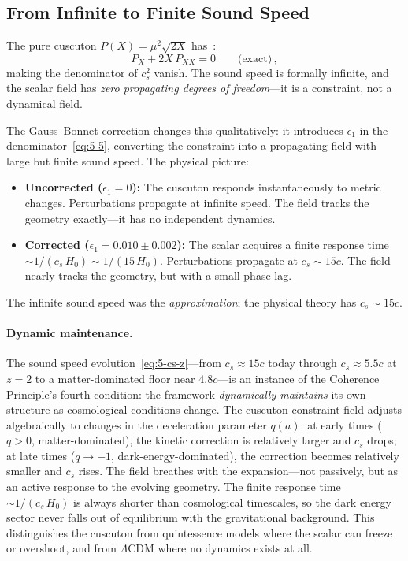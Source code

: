 \subsection{From Infinite to Finite Sound Speed}
\label{sec:5-infinite-to-finite}

The pure cuscuton $P(X) = \mu^2\sqrt{2X}$ has~\cite{ch5:Afshordi2007}:
\begin{equation}
  P_X + 2X\,P_{XX} = 0 \qquad\text{(exact)}\,,
  \label{eq:5-15}
\end{equation}
making the denominator of $c_s^2$ vanish. The sound speed is formally infinite, and the scalar field has \emph{zero propagating degrees of freedom}---it is a constraint, not a dynamical field.

The Gauss--Bonnet correction changes this qualitatively: it introduces $\epsilon_1$ in the denominator~\eqref{eq:5-5}, converting the constraint into a propagating field with large but finite sound speed. The physical picture:

\begin{itemize}
\item \textbf{Uncorrected ($\epsilon_1 = 0$):} The cuscuton responds instantaneously to metric changes. Perturbations propagate at infinite speed. The field tracks the geometry exactly---it has no independent dynamics.

\item \textbf{Corrected ($\epsilon_1 = 0.010 \pm 0.002$):} The scalar acquires a finite response time $\sim 1/(c_s\,H_0) \sim 1/(15\,H_0)$. Perturbations propagate at $c_s \sim 15c$. The field nearly tracks the geometry, but with a small phase lag.
\end{itemize}

The infinite sound speed was the \emph{approximation}; the physical theory has $c_s \sim 15c$.

\paragraph{Dynamic maintenance.}
The sound speed evolution~\eqref{eq:5-cs-z}---from $c_s \approx 15c$ today through $c_s \approx 5.5c$ at $z = 2$ to a matter-dominated floor near $4.8c$---is an instance of the Coherence Principle's fourth condition: the framework \emph{dynamically maintains} its own structure as cosmological conditions change. The cuscuton constraint field adjusts algebraically to changes in the deceleration parameter $q(a)$: at early times ($q > 0$, matter-dominated), the kinetic correction is relatively larger and $c_s$ drops; at late times ($q \to -1$, dark-energy-dominated), the correction becomes relatively smaller and $c_s$ rises. The field breathes with the expansion---not passively, but as an active response to the evolving geometry. The finite response time $\sim 1/(c_s\,H_0)$ is always shorter than cosmological timescales, so the dark energy sector never falls out of equilibrium with the gravitational background. This distinguishes the cuscuton from quintessence models where the scalar can freeze or overshoot, and from $\Lambda$CDM where no dynamics exists at all.

